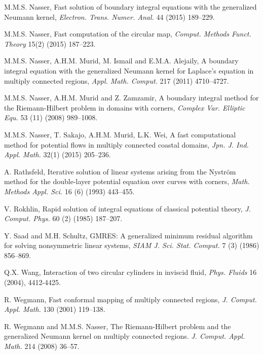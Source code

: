 \documentclass[11pt,a4paper]{article}
\begin{document}
\begin{thebibliography}{00}
M.M.S. Nasser,  Fast solution of boundary integral equations with the generalized Neumann kernel, \emph{Electron. Trans. Numer. Anal.} 44 (2015) 189--229.

M.M.S. Nasser, Fast computation of the circular map, \emph{Comput. Methods Funct. Theory} 15(2) (2015) 187--223.

M.M.S. Nasser, A.H.M. Murid, M. Ismail and E.M.A. Alejaily, A boundary integral equation with the generalized Neumann kernel for Laplace's equation in multiply connected regions, \emph{Appl. Math. Comput.} 217 (2011) 4710--4727.

M.M.S. Nasser, A.H.M. Murid and Z. Zamzamir, A boundary integral method for the Riemann-Hilbert problem in domains with corners,
\emph{Complex Var. Elliptic Equ.} 53 (11) (2008) 989--1008.

M.M.S. Nasser, T. Sakajo, A.H.M. Murid, L.K. Wei, A fast computational method for potential flows in multiply connected coastal domains, \emph{Jpn. J. Ind. Appl. Math.} 32(1) (2015) 205--236.

A. Rathsfeld, Iterative solution of linear systems arising from the Nystr\"om method for the double-layer potential equation over curves with corners, \emph{Math. Methods Appl. Sci.} 16 (6) (1993) 443--455.

V. Rokhlin, Rapid solution of integral equations of classical potential theory, \emph{J. Comput. Phys.} 60 (2) (1985) 187--207.

Y. Saad and M.H. Schultz, GMRES: A generalized minimum residual algorithm for solving nonsymmetric linear systems, \emph{SIAM J. Sci. Stat. Comput.} 7 (3) (1986) 856--869.

Q.X. Wang, Interaction of two circular cylinders in inviscid fluid, \emph{Phys. Fluids} 16 (2004), 4412-4425.

R. Wegmann, Fast conformal mapping of multiply connected regions, \emph{J. Comput. Appl. Math.} 130 (2001) 119--138.

R. Wegmann and  M.M.S. Nasser, The Riemann-Hilbert problem and the generalized Neumann kernel on multiply connected regions. \emph{J. Comput. Appl. Math.}  214 (2008) 36--57.
 
\end{thebibliography}
\end{document}
